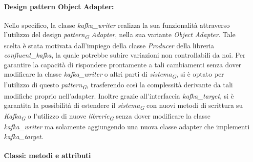 \paragraph{Design pattern Object Adapter:}
Nello specifico, la classe \textit{kafka\_writer} realizza la sua funzionalità attraverso l'utilizzo del design \textit{pattern}\textsubscript{\textit{G}} \textit{Adapter}, nella sua variante \textit{Object Adapter}. Tale scelta è stata motivata dall'impiego della classe \textit{Producer} della libreria \textit{confluent\_kafka}, la quale potrebbe subire variazioni non controllabili da noi. Per garantire la capacità di rispondere prontamente a tali cambiamenti senza dover modificare la classe \textit{kafka\_writer} o altri parti di \textit{sistema}\textsubscript{\textit{G}}, si è optato per l'utilizzo di questo \textit{pattern}\textsubscript{\textit{G}}, trasferendo così la complessità derivante da tali modifiche proprio nell'adapter.
Inoltre grazie all'interfaccia \textit{kafka\_target}, si è garantita la possibilità di estendere il \textit{sistema}\textsubscript{\textit{G}} con nuovi metodi di scrittura su \textit{Kafka}\textsubscript{\textit{G}} o l'utilizzo di nuove \textit{librerie}\textsubscript{\textit{G}} senza dover modificare la classe \textit{kafka\_writer} ma solamente aggiungendo una nuova classe adapter che implementi \textit{kafka\_target}.

\paragraph{Classi: metodi e attributi}

